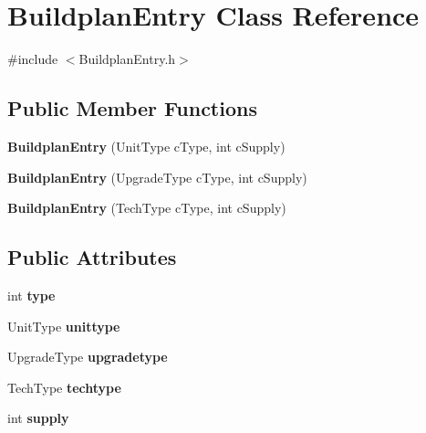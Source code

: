 \hypertarget{class_buildplan_entry}{\section{Buildplan\-Entry Class Reference}
\label{class_buildplan_entry}
}


{\ttfamily \#include $<$Buildplan\-Entry.\-h$>$}

\subsection*{Public Member Functions}
\begin{DoxyCompactItemize}
\item 
\hypertarget{class_buildplan_entry_a42d8c985f12bcab4ba9eab1eefce97f1}{{\bfseries Buildplan\-Entry} (Unit\-Type c\-Type, int c\-Supply)}\label{class_buildplan_entry_a42d8c985f12bcab4ba9eab1eefce97f1}

\item 
\hypertarget{class_buildplan_entry_ae7d4267b8d8cef56ee45c3f3ca59cdd4}{{\bfseries Buildplan\-Entry} (Upgrade\-Type c\-Type, int c\-Supply)}\label{class_buildplan_entry_ae7d4267b8d8cef56ee45c3f3ca59cdd4}

\item 
\hypertarget{class_buildplan_entry_a144b247808682172e248a206b30fe68b}{{\bfseries Buildplan\-Entry} (Tech\-Type c\-Type, int c\-Supply)}\label{class_buildplan_entry_a144b247808682172e248a206b30fe68b}

\end{DoxyCompactItemize}
\subsection*{Public Attributes}
\begin{DoxyCompactItemize}
\item 
\hypertarget{class_buildplan_entry_aff25e59e133f972b8bde233702c9a75f}{int {\bfseries type}}\label{class_buildplan_entry_aff25e59e133f972b8bde233702c9a75f}

\item 
\hypertarget{class_buildplan_entry_a87776ef300e7a415ff104ea8e7d93e9f}{Unit\-Type {\bfseries unittype}}\label{class_buildplan_entry_a87776ef300e7a415ff104ea8e7d93e9f}

\item 
\hypertarget{class_buildplan_entry_ab94dd8b4d75e0ad8d3e96bcadb2270aa}{Upgrade\-Type {\bfseries upgradetype}}\label{class_buildplan_entry_ab94dd8b4d75e0ad8d3e96bcadb2270aa}

\item 
\hypertarget{class_buildplan_entry_a2ffaa5e19a85c7528f08ac9d68191da2}{Tech\-Type {\bfseries techtype}}\label{class_buildplan_entry_a2ffaa5e19a85c7528f08ac9d68191da2}

\item 
\hypertarget{class_buildplan_entry_a90c628fb29043f658f34549da944a27c}{int {\bfseries supply}}\label{class_buildplan_entry_a90c628fb29043f658f34549da944a27c}

\end{DoxyCompactItemize}
